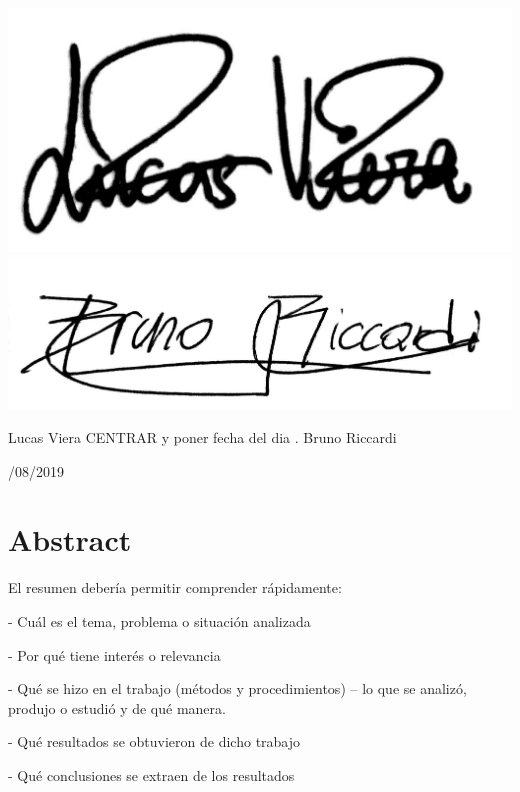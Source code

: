 \documentclass[12pt,a4paper,oneside]{book}
\begin{document}
 
\vspace{2cm}

\includegraphics[scale=0.08]{fotos/0_Caratula/firmas/firmaLucasBYN.JPG} \hfill
\includegraphics[scale=0.08]{fotos/0_Caratula/firmas/firmaBrunoBYN.JPG} \hfill


Lucas Viera CENTRAR y poner fecha del dia . \hfill  Bruno Riccardi \\

\vspace{1cm}


{/08/2019 
 
}


\chapter*{Abstract}

El resumen debería permitir comprender rápidamente:

- Cuál es el tema, problema o situación analizada

- Por qué tiene interés o relevancia

- Qué se hizo en el trabajo (métodos y procedimientos) – lo que se analizó, produjo o estudió y de qué manera.

- Qué resultados se obtuvieron de dicho trabajo

- Qué conclusiones se extraen de los resultados



\vspace{0.5 cm}
\end{document}
